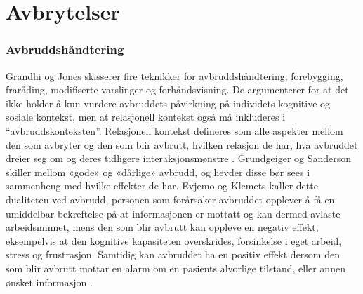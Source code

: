 \section{Avbrytelser}
\label{chp: avbrytelser} 

\subsubsection{Avbruddshåndtering}
Grandhi og Jones skisserer fire teknikker for avbruddshåndtering; forebygging, fraråding, modifiserte varslinger og forhåndsvisning. De argumenterer for at det ikke holder å kun vurdere avbruddets påvirkning på individets kognitive og sosiale kontekst, men at relasjonell kontekst også må inkluderes i “avbruddskonteksten”. Relasjonell kontekst defineres som alle aspekter mellom den som avbryter og den som blir avbrutt, hvilken relasjon de har, hva avbruddet dreier seg om og deres tidligere interaksjonsmønstre \cite{Grandhi10}. Grundgeiger og Sanderson skiller mellom «gode» og «dårlige» avbrudd, og hevder disse bør sees i sammenheng med hvilke effekter de har. Evjemo og Klemets kaller dette dualiteten ved avbrudd, personen som forårsaker avbruddet opplever å få en umiddelbar bekreftelse på at informasjonen er mottatt og kan dermed avlaste arbeidsminnet, mens den som blir avbrutt kan oppleve en negativ effekt, eksempelvis at den kognitive kapasiteten overskrides, forsinkelse i eget arbeid, stress og frustrasjon. Samtidig kan avbruddet ha en positiv effekt dersom den som blir avbrutt mottar en alarm om en pasients alvorlige tilstand, eller annen ønsket informasjon \cite{Evjemo, Grundgeiger09}.
